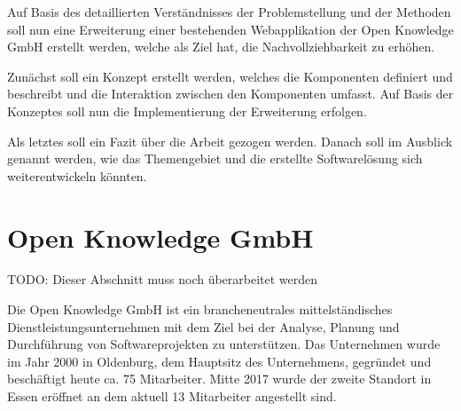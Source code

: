 
Auf Basis des detaillierten Verständnisses der Problemstellung und der Methoden soll nun eine Erweiterung einer bestehenden Webapplikation der Open Knowledge GmbH erstellt werden, welche als Ziel hat, die Nachvollziehbarkeit zu erhöhen.

Zunächst soll ein Konzept erstellt werden, welches die Komponenten definiert und beschreibt und die Interaktion zwischen den Komponenten umfasst. Auf Basis der Konzeptes soll nun die Implementierung der Erweiterung erfolgen.

Als letztes soll ein Fazit über die Arbeit gezogen werden. Danach soll im Ausblick genannt werden, wie das Themengebiet und die erstellte Softwarelösung sich weiterentwickeln könnten.


\newpage

\section{Open Knowledge GmbH}

{\color{red}TODO: Dieser Abschnitt muss noch überarbeitet werden}

Die Open Knowledge GmbH ist ein brancheneutrales mittelständisches Dienstleistungsunternehmen mit dem Ziel bei der Analyse, Planung und Durchführung von Softwareprojekten zu unterstützen. Das Unternehmen wurde im Jahr 2000 in Oldenburg, dem Hauptsitz des Unternehmens, gegründet und beschäftigt heute ca. 75 Mitarbeiter. Mitte 2017 wurde der zweite Standort in Essen eröffnet an dem aktuell 13 Mitarbeiter angestellt sind.

